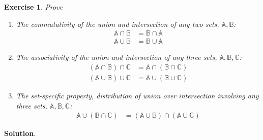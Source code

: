 \documentclass[11pt]{book}
\theoremstyle{definition}
\theoremstyle{plain}
\newtheorem{exercise}{Exercise}
\theoremstyle{definition}
\theoremstyle{problemstyle}
\theoremstyle{remark}
\theoremstyle{definition}
\begin{document}
\begin{exercise}
Prove
    \begin{enumerate}[label={(\alph*)}]
        \item The commutativity of the union and intersection of any two sets, $\mathbb{A},\mathbb{B}$:
            \begin{align}
                \mathbb{A}\cap\mathbb{B}&=\mathbb{B}\cap\mathbb{A}\nonumber\\
                \mathbb{A}\cup\mathbb{B}&=\mathbb{B}\cup\mathbb{A}
                \label{eq:set-commut}
            \end{align}
        \item The associativity of the union and intersection of any three sets, $\mathbb{A},\mathbb{B},\mathbb{C}$:
            \begin{align}
                (\mathbb{A}\cap\mathbb{B})\cap\mathbb{C}&=\mathbb{A}\cap(\mathbb{B}\cap\mathbb{C})\nonumber\\
                (\mathbb{A}\cup\mathbb{B})\cup\mathbb{C}&=\mathbb{A}\cup(\mathbb{B}\cup\mathbb{C})
                \label{eq:set-assoc}
            \end{align}
        \item The set-specific property, distribution of union over intersection involving any three sets, $\mathbb{A},\mathbb{B},\mathbb{C}$:
            \begin{align}
                \mathbb{A}\cup(\mathbb{B}\cap\mathbb{C})&=(\mathbb{A}\cup\mathbb{B})\cap(\mathbb{A}\cup\mathbb{C})
                \label{eq:set-peculiar-distributivity}
            \end{align}
    \end{enumerate}

    \label{ex:1.2.16}
\end{exercise}
\textbf{Solution}.
\end{document}
